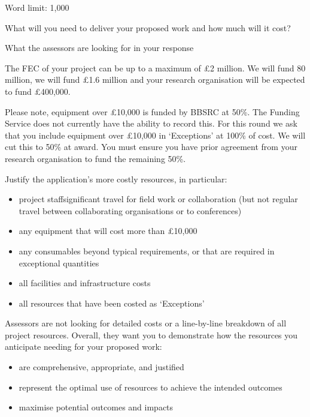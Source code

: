 \documentclass[12pt]{article}
\newenvironment{instruction}{\par\color{red}}{\par}
\begin{document}
\begin{instruction}

Word limit: 1,000

What will you need to deliver your proposed work and how much will it cost?

What the assessors are looking for in your response

The FEC of your project can be up to a maximum of £2 million. We will fund
80%
million, we will fund £1.6 million and your research organisation will be
expected to fund £400,000.

Please note, equipment over £10,000 is funded by BBSRC at 50\%. The
Funding Service does not currently have the ability to record this. For this round
we ask that you include equipment over £10,000 in ‘Exceptions’ at 100\% of
cost. We will cut this to 50\% at award. You must ensure you have prior
agreement from your research organisation to fund the remaining 50\%.

Justify the application’s more costly resources, in particular:

\begin{itemize}

	\item project staffsignificant travel for field work or collaboration (but
not regular travel between collaborating organisations or to conferences)

	\item any equipment that will cost more than £10,000

	\item any consumables beyond typical requirements, or that are required in
exceptional quantities

	\item all facilities and infrastructure costs

	\item all resources that have been costed as ‘Exceptions’

\end{itemize}

Assessors are not looking for detailed costs or a line-by-line breakdown of all
project resources. Overall, they want you to demonstrate how the resources
you anticipate needing for your proposed work:

\begin{itemize}

	\item are comprehensive, appropriate, and justified

	\item represent the optimal use of resources to achieve the intended
outcomes

	\item maximise potential outcomes and impacts

\end{itemize}

\end{instruction}
\end{document}
